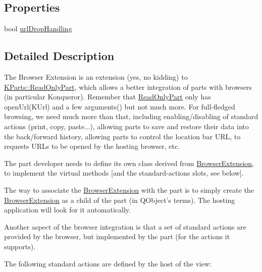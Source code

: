 \subsection*{Properties}
\begin{DoxyCompactItemize}
\item 
bool \hyperlink{classKParts_1_1BrowserExtension_a3f4216207e98c29842379e4abf2c1c06}{url\+Drop\+Handling}
\end{DoxyCompactItemize}


\subsection{Detailed Description}
The Browser Extension is an extension (yes, no kidding) to \hyperlink{classKParts_1_1ReadOnlyPart}{K\+Parts\+::\+Read\+Only\+Part}, which allows a better integration of parts with browsers (in particular Konqueror). Remember that \hyperlink{classKParts_1_1ReadOnlyPart}{Read\+Only\+Part} only has open\+Url(\+K\+Url) and a few arguments() but not much more. For full-\/fledged browsing, we need much more than that, including enabling/disabling of standard actions (print, copy, paste...), allowing parts to save and restore their data into the back/forward history, allowing parts to control the location bar U\+R\+L, to requests U\+R\+Ls to be opened by the hosting browser, etc.

The part developer needs to define its own class derived from \hyperlink{classKParts_1_1BrowserExtension}{Browser\+Extension}, to implement the virtual methods \mbox{[}and the standard-\/actions slots, see below\mbox{]}.

The way to associate the \hyperlink{classKParts_1_1BrowserExtension}{Browser\+Extension} with the part is to simply create the \hyperlink{classKParts_1_1BrowserExtension}{Browser\+Extension} as a child of the part (in Q\+Object's terms). The hosting application will look for it automatically.

Another aspect of the browser integration is that a set of standard actions are provided by the browser, but implemented by the part (for the actions it supports).

The following standard actions are defined by the host of the view\+:

